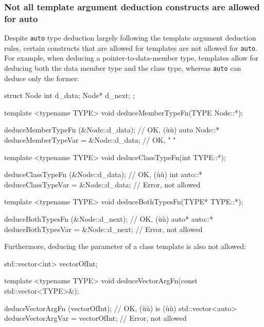 \subsubsection[Not all template argument deduction constructs are allowed for \lstinline!auto!]{Not all template argument deduction constructs are allowed for {\SubsubsecCode auto}}\label{not-all-template-argument-deduction-constructs-are-allowed-for-auto}

Despite \lstinline!auto! type deduction largely following the template
argument deduction rules, certain constructs that are allowed for
templates are not allowed for \lstinline!auto!. For example, when deducing
a pointer-to-data-member type, templates allow for deducing both the
data member type and the class type, whereas \lstinline!auto! can 
deduce only the former:

\begin{emcppslisting}[language=C++]
struct Node
{
    int   d_data;
    Node* d_next;
};

template <typename TYPE>
void deduceMemberTypeFn(TYPE Node::*);

             deduceMemberTypeFn   (&Node::d_data);  // OK, (ù{}ù)
auto Node::* deduceMemberTypeVar = &Node::d_data;   // OK,   "     "


template <typename TYPE>
void deduceClassTypeFn(int TYPE::*);

            deduceClassTypeFn   (&Node::d_data);  // OK, (ù{}ù)
int auto::* deduceClassTypeVar = &Node::d_data;   // Error, not allowed


template <typename TYPE>
void deduceBothTypesFn(TYPE* TYPE::*);

              deduceBothTypesFn   (&Node::d_next);  // OK, (ù{}ù)
auto* auto::* deduceBothTypesVar = &Node::d_next;   // Error, not allowed
\end{emcppslisting}
    
\noindent Furthermore, deducing the parameter of a class template is also not
allowed:

\begin{emcppslisting}[language=C++]
std::vector<int> vectorOfInt;

template <typename TYPE>
void deduceVectorArgFn(const std::vector<TYPE>&);

                  deduceVectorArgFn   (vectorOfInt); // OK, (ù{}ù) is (ù{}ù)
std::vector<auto> deduceVectorArgVar = vectorOfInt;  // Error, not allowed
\end{emcppslisting}
    
